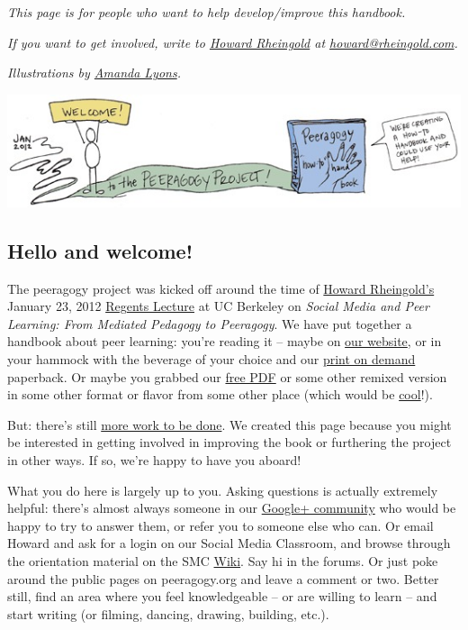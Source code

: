 \emph{This page is for people who want to help develop/improve this
handbook.}

\emph{If you want to get involved, write to
\href{http://en.wikipedia.org/wiki/Howard\_Rheingold}{Howard Rheingold}
at \href{mailto:howard@rheingold.com}{howard@rheingold.com}.}

\emph{Illustrations by \href{http://www.visualsforchange.com/}{Amanda
Lyons}.}

\begin{center}
\href{http://peeragogy.org/wp-content/uploads/2012/03/welcome\_color.gif}{\includegraphics[width=.9\textwidth]{../pictures/welcome_color.jpg}}
\end{center}

\subsection{Hello and welcome!}

The peeragogy project was kicked off around the time of
\href{http://rheingold.com/}{Howard Rheingold's} January 23, 2012
\href{http://vimeo.com/35685124}{Regents Lecture} at UC Berkeley on
\emph{Social Media and Peer Learning: From Mediated Pedagogy to
Peeragogy}. We have put together a handbook about peer learning: you're
reading it -- maybe on \href{peeragogy.org}{our website}, or in your
hammock with the beverage of your choice and our
\href{http://www.lulu.com/shop/howard-rheingold-and-peeragogyorg-editors/the-peeragogy-handbook/paperback/product-20607425.html}{print
on demand} paperback. Or maybe you grabbed our
\href{http://peeragogy.net/peeragogy-handbook-v1-1.pdf}{free PDF} or
some other remixed version in some other format or flavor from some
other place (which would be
\href{http://peeragogy.org/resources/license/}{cool}!).

But: there's still
\href{http://peeragogy.org/peeragogy-org-roadmap/}{more work to be
done}. We created this page because you might be interested in getting
involved in improving the book or furthering the project in other ways.
If so, we're happy to have you aboard!

What you do here is largely up to you. Asking questions is actually
extremely helpful: there's almost always someone in our
\href{https://plus.google.com/u/0/communities/107386162349686249470}{Google+
community} who would be happy to try to answer them, or refer you to
someone else who can. Or email Howard and ask for a login on our Social
Media Classroom, and browse through the orientation material on the SMC
\href{http://socialmediaclassroom.com/host/peeragogy}{Wiki}. Say hi in
the forums. Or just poke around the public pages on peeragogy.org and
leave a comment or two. Better still, find an area where you feel
knowledgeable -- or are willing to learn -- and start writing (or
filming, dancing, drawing, building, etc.).

